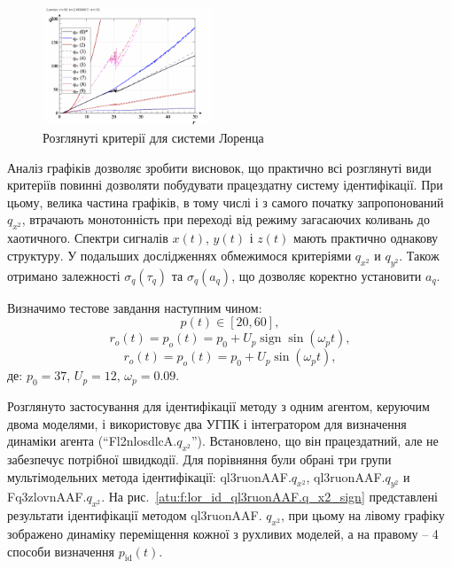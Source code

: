 \documentclass[a4paper,13pt]{atuaref}
\DeclareMathOperator*{\sign}{sign}
\begin{document}
\begin{figure}[ht!]
  \centerline{\includegraphics[width=0.45\textwidth]{p5/p/cha/lor/lor_q-p_q_r.png} }
  \caption{Розглянуті критерії для системи Лоренца}
  \label{atu:f:lor_q}
\end{figure}

Аналіз графіків дозволяє зробити висновок, що практично всі розглянуті види
критеріїв повинні дозволяти побудувати працездатну систему ідентифікації. При
цьому, велика частина графіків, в тому числі і з самого початку запропонований
$q_{x^2}$, втрачають монотонність при переході від режиму загасаючих
коливань до хаотичного.
Спектри сигналів $ x (t) $, $ y (t) $ і $ z (t) $ мають практично однакову
структуру. У подальших дослідженнях обмежимося критеріями
$q_{x^2}$ и
$q_{y^2}$.
Також отримано залежності $ \sigma_q(\tau_q) $ та  $ \sigma_q(a_q) $,
що дозволяє коректно установити $a_q$.

Визначимо тестове завдання наступним чином:
\[
  p(t) \in [20, 60],
\]
%
\begin{equation}
  r_o(t) = p_o(t) = p_0 +  U_{p} \sign \sin( \omega_{p} t ),
  \label{atu:eq:lor_po_t_sign}
\end{equation}
%
%
\begin{equation}
  r_o(t) = p_o(t) = p_0 +  U_{p} \sin( \omega_{p} t ),
  \label{atu:eq:lor_po_t_sin}
\end{equation}
%
де:
$p_0 = 37$, $U_p=12$, $\omega_p=0.09$.

Розглянуто застосування для ідентифікації методу з одним агентом, керуючим двома
моделями, і використовує два УГПК і інтегратором для визначення динаміки агента
(``Fl2nlosdlcA.$q_{x^2}$''). Встановлено, що він
працездатний, але
не забезпечує потрібної швидкодії.
Для порівняння були обрані три групи мультімодельних метода ідентифікації:
ql3ruonAAF.$q_{x^2}$,
ql3ruonAAF.$q_{y^2}$ и
Fq3zlovnAAF.$q_{x^2}$.
На рис.~\ref{atu:f:lor_id_ql3ruonAAF.q_x2_sign} представлені результати
ідентифікації методом ql3ruonAAF. $q_{x^2} $, при цьому на лівому графіку
зображено динаміку переміщення кожної з рухливих моделей, а на правому -- 4
способи визначення $ p_\mathrm{id} (t) $.
\end{document}

